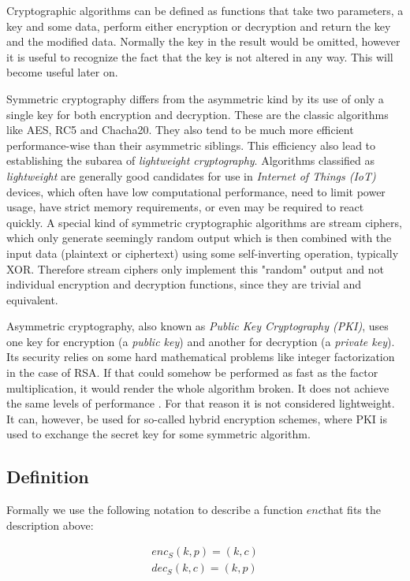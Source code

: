 \documentclass[a4paper,10pt,openright]{memoir}
\def\enc{\ensuremath{\mathit{enc}}}
\def\dec{\ensuremath{\mathit{dec}}}
\newcommand{\term}[1]{\textit{#1}}
\begin{document}
Cryptographic algorithms can be defined as functions that take two 
parameters, a key and some data, perform either encryption or 
decryption and return the key and the modified data. Normally the key 
in the result would be omitted, however it is useful to recognize the 
fact that the key is not altered in any way. This will become useful 
later on.

Symmetric cryptography differs from the asymmetric kind by its use of 
only a single key for both encryption and decryption. These are the 
classic algorithms like AES, RC5 and Chacha20. They also tend to be 
much more efficient performance-wise than their asymmetric siblings. 
This efficiency also lead to establishing the subarea of 
\term{lightweight cryptography}. Algorithms classified as 
\term{lightweight} are generally good candidates for use in 
\term{Internet of Things (IoT)} devices, which often have low 
computational performance, need to limit power usage, have strict 
memory requirements, or even may be required to react quickly. A 
special kind of symmetric cryptographic algorithms are stream ciphers, 
which only generate seemingly random output which is then combined with 
the input data (plaintext or ciphertext) using some self-inverting 
operation, typically XOR. Therefore stream ciphers only implement this 
"random" output and not individual encryption and decryption functions, 
since they are trivial and equivalent.

Asymmetric cryptography, also known as \term{Public Key Cryptography 
(PKI)}, uses one key for encryption (a \term{public key}) and another 
for decryption (a \term{private key}). Its security relies on some hard 
mathematical problems like integer factorization in the case of RSA. If 
that could somehow be performed as fast as the factor multiplication, 
it would render the whole algorithm broken. It does not achieve the 
same levels of performance \cite{sym-asym}. For that reason it is not 
considered lightweight. It can, however, be used for so-called hybrid 
encryption schemes, where PKI is used to exchange the secret key for 
some symmetric algorithm.

\subsection{Definition}

Formally we use the following notation to describe a function 
\enc that fits the description above:

\begin{align*}
\enc_S(k,p) = (k,c) \\
\dec_S(k,c) = (k,p) 
\end{align*}
\end{document}
